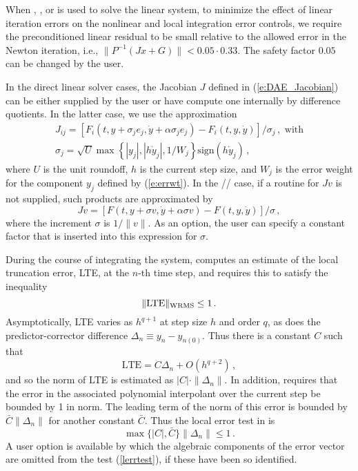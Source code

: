 When {\spgmr}, {\spbcg}, or {\sptfqmr} is used to solve the linear system, to
minimize the effect of linear iteration errors on the nonlinear and local integration
error controls, we require the preconditioned linear residual to be small relative to
the allowed error in the Newton iteration, i.e., 
$\| P^{-1}(Jx+G) \| < 0.05 \cdot 0.33$.
The safety factor $0.05$ can be changed by the user.

In the direct linear solver 
cases, the Jacobian $J$ defined in (\ref{e:DAE_Jacobian}) 
can be either supplied by the user or have {\idas} compute one internally 
by difference quotients. In the latter case, we use the approximation
\begin{gather*}
  J_{ij} = [F_i(t,y+\sigma_j e_j, \dot y + \alpha\sigma_j e_j) - 
            F_i(t,y, \dot y)]/\sigma_j \, , \text{ with}\\
  \sigma_j = \sqrt{U} \max \left\{ |y_j|, |h \dot y_j|,1/W_j \right\}
             \mbox{sign}(h \dot y_j) \, ,
\end{gather*}
where $U$ is the unit roundoff, $h$ is the current step size, and $W_j$ is 
the error weight for the component $y_j$ defined by (\ref{e:errwt}).
In the {\spgmr}/{\spbcg}/{\sptfqmr} case, if a routine for $Jv$ is not
supplied, such products are approximated by
\begin{equation*}
Jv = [F(t,y+\sigma v, \dot y +\alpha\sigma v) - F(t,y, \dot y)]/\sigma \, ,
\end{equation*}
where the increment $\sigma$ is $1/\|v\|$.  As an option, the user can
specify a constant factor that is inserted into this expression for $\sigma$.

During the course of integrating the system, {\idas} computes an estimate
of the local truncation error, LTE, at the $n$-th time step, and
requires this to satisfy the inequality
\begin{equation*}
  \| \mbox{LTE} \|_{\mbox{\scriptsize WRMS}} \leq 1 \, .               
\end{equation*}
Asymptotically, LTE varies as $h^{q+1}$ at step size $h$ and order $q$, as
does the predictor-corrector difference $\Delta_n \equiv y_n-y_{n(0)}$.  
Thus there is a constant $C$ such that
\[ \mbox{LTE} = C \Delta_n + O(h^{q+2}) \, , \]
and so the norm of LTE is estimated as $|C| \cdot \|\Delta_n\|$.
In addition, {\idas} requires that the error in the associated polynomial
interpolant over the current step be bounded by 1 in norm.  The
leading term of the norm of this error is bounded by
$\bar{C} \|\Delta_n\|$ for another constant $\bar{C}$.  Thus the local
error test in {\idas} is
\begin{equation}\label{lerrtest}
   \max\{ |C|, \bar{C} \} \|\Delta_n\| \leq 1 \, .
\end{equation}
A user option is available by which the algebraic components of the
error vector are omitted from the test (\ref{lerrtest}), if these have
been so identified.

